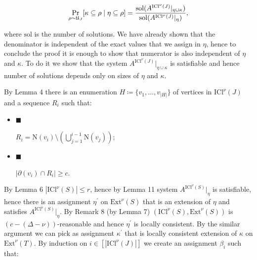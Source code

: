 \documentclass[10pt,a4paper]{article}
\begin{document}
\[\begin{gathered}
\Pr\limits_{\rho\sim\mathfrak{U}_{J}}[\kappa\subseteq\rho\mid\eta\subseteq\rho%
]=\frac{\mathrm{sol}(A^{\mathrm{ICl}^{\nu}\left(J\right)}|_{\eta\cup\kappa})}{%
\mathrm{sol}(A^{\mathrm{ICl}^{\nu}\left(J\right)}|_{\eta})},
\end{gathered}\]


where $\mathrm{sol}$ is the number of solutions. We have already shown that the denominator is
independent of the exact values that we assign in $\eta$, hence to conclude the proof it is enough to
show that numerator is also independent of $\eta$ and $\kappa$. To do it we show that the system
$A^{\mathrm{ICl}^{\nu}\left(J\right)}|_{\eta\cup\kappa}$ is satisfiable and hence number of solutions depends only
on sizes of $\eta$ and $\kappa$.\par




By Lemma 4 there is an enumeration $H\coloneqq\{v_{1},\dots,v_{|H|}\}$ of
vertices in $\mathrm{ICl}^{\nu}\left(J\right)$ and a sequence $R_{i}$ such that:\par


\begin{itemize}


\item[] 
$\blacksquare$ 


$R_{i}=\mathrm{N}\left(v_{i}\right)\setminus\left(\bigcup\limits_{j=1}^{i-1}%
\mathrm{N}\left(v_{j}\right)\right)$;\par





\item[] 
$\blacksquare$ 


$|\partial(v_{i})\cap R_{i}|\geq c$.\par





\end{itemize}




By Lemma 6 $|\mathrm{ICl}^{\nu}\left(S\right)|\leq r$, hence by Lemma 11
system $A^{\mathrm{ICl}^{\nu}\left(S\right)}|_{\eta}$ is satisfiable, hence there is an assignment $\eta^{\prime}$ on
$\mathrm{Ext}^{\nu}\left(S\right)$ that is an extension of $\eta$ and satisfies $A^{\mathrm{ICl}^{\nu}\left(S\right)}|_{\eta}$. By Remark
8 (by Lemma 7) $(\mathrm{ICl}^{\nu}\left(S\right),\mathrm{Ext}^{\nu}\left(S\right))$
is $(c-(\Delta-\nu))$-reasonable and hence $\eta^{\prime}$ is locally consistent. By the similar argument
we can pick as assignment $\kappa^{\prime}$ that is locally consistent extension of $\kappa$ on
$\mathrm{Ext}^{\nu}\left(T\right)$. By induction on $i\in[|\mathrm{ICl}^{\nu}\left(J\right)|]$ we create an assignment $\beta_{i}$ such
that:\par
\end{document}
